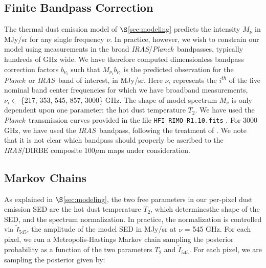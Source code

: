 \documentclass{emulateapj}
\newcommand{\IRAS}{{\it IRAS}}
\newcommand{\PLANCK}{{\it Planck}}
\begin{document}
\subsection{Finite Bandpass Correction}
The thermal dust emission model of $\S$\ref{sec:modeling} predicts the 
intensity $M_{\nu}$ in MJy/sr for any single frequency $\nu$. In practice, 
however, we wish to constrain our model using measurements in the broad 
\IRAS/\PLANCK~bandpasses, typically hundreds of GHz wide. We have therefore 
computed dimensionless bandpass correction factors $b_{\nu_i}$ such that 
$M_{\nu_i}b_{\nu_i}$ is the predicted observation for the \PLANCK~or \IRAS~band
 of interest, in MJy/sr. Here $\nu_i$ represents the $i^{th}$ of the five 
nominal band center frequencies for which we have broadband measurements, 
$\nu_i \in$ \{217, 353, 545, 857, 3000\} GHz. The shape of model spectrum 
$M_{\nu}$ is only dependent upon one parameter: the hot dust temperature $T_2$.
 We have used the \PLANCK~transmission curves provided in the file 
\verb|HFI_RIMO_R1.10.fits| \citep{planckresponse}. For 3000 GHz, we have used 
the \IRAS~bandpass, following the treatment of \cite{planckdust}. We note that 
it is not clear which bandpass should properly be ascribed to the \IRAS/DIRBE 
composite 100$\mu$m maps under consideration. 



\subsection{Markov Chains}
As explained in $\S$\ref{sec:modeling}, the two free parameters in our 
per-pixel dust emission SED are the hot dust temperature $T_2$, which 
determinesthe shape of the SED, and the spectrum normalization. In practice,
the normalization is controlled via $\tilde{I}_{545}$, the amplitude of the 
model SED in MJy/sr at $\nu$ = 545 GHz. For each pixel, we run a 
Metropolis-Hastings Markov chain sampling the posterior probability as a 
function of the two parameters $T_2$ and $\tilde{I}_{545}$. For each pixel, we 
are sampling the posterior given by:

\end{document}
